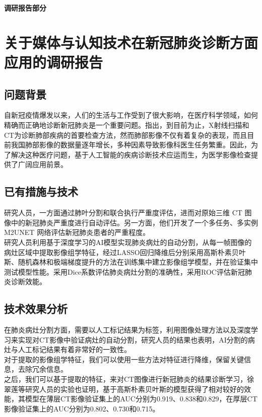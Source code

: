 \documentclass[a4paper]{article}
\begin{document}
\courseheader
{}
\vspace{3mm}
\centerline{\textbf{\Large{调研报告部分}}}
\vspace{3mm}

\section{关于媒体与认知技术在新冠肺炎诊断方面应用的调研报告}
\subsection{问题背景}
\hspace{2em}自新冠疫情爆发以来，人们的生活与工作受到了很大影响，在医疗科学领域，如何精确而正确地诊断新冠肺炎是一个重要问题。\cite{111}指出，到目前为止，X射线扫描和CT为诊断肺部疾病的首要检查方法，然而肺部影像不仅有着复杂的表现，而且目前我国肺部影像的数据量逐年增长，多种因素导致影像科医生任务繁重。因此，为了解决这种医疗问题，基于人工智能的疾病诊断技术应运而生，为医学影像检查提供了广阔应用前景。
\subsection{已有措施与技术}
\hspace{2em} \cite{222}研究人员，一方面通过肺叶分割和联合执行严重度评估，进而对原始三维 CT 图 像中的新冠肺炎严重度进行自动评估。另一方面，他们开发了一个多任务、多实例 M2UNET 网络评估新冠肺炎患者的严重程度。\\
\hspace{2em}\cite{333}研究人员利用基于深度学习的AI模型实现肺炎病灶的自动分割，从每一帧图像的病灶区域中提取影像组学特征，经过LASSO回归降维后分别采用高斯朴素贝叶斯、随机森林和极端梯度提升的方法在训练集中建立影像组学模型，并在验证集中测试模型性能。采用Dice系数评估肺炎病灶分割的准确性，采用ROC评估新冠肺炎诊断效能。
\subsection{技术效果分析}
\hspace{2em}在肺炎病灶分割方面，需要以人工标记结果为标签，利用图像处理方法以及深度学习来实现对CT影像中验证病灶的自动分割，研究人员的结果也表明，AI分割的病灶与人工标记结果有着非常好的一致性。\\
\hspace{2em}对于提取的影像组学特征，我们可以使用一些方法对特征进行降维，保留关键信息，去除冗余信息。\\
\hspace{2em}之后，我们可以基于提取的特征，来对CT图像进行新冠肺炎的结果诊断学习，徐翠莲等研究人员的实验也证明，基于高斯朴素贝叶斯的模型获得了相对较好的效能，其模型在薄层CT影像验证集上的AUC分别为0.919、0.838和0.829，在厚层CT影像验证集上的AUC分别为0.802、0.730和0.715。
\end{document}
